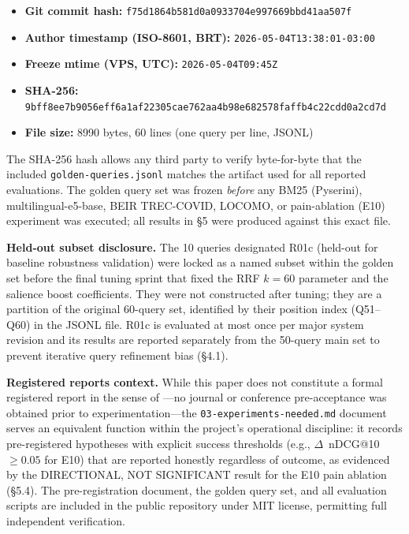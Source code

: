\begin{itemize}
  \item \textbf{Git commit hash:} \texttt{f75d1864b581d0a0933704e997669bbd41aa507f}
  \item \textbf{Author timestamp (ISO-8601, BRT):} \texttt{2026-05-04T13:38:01-03:00}
  \item \textbf{Freeze mtime (VPS, UTC):} \texttt{2026-05-04T09:45Z}
  \item \textbf{SHA-256:} \texttt{9bff8ee7b9056eff6a1af22305cae762aa4b98e682578faffb4c22cdd0a2cd7d}
  \item \textbf{File size:} 8990 bytes, 60 lines (one query per line, JSONL)
\end{itemize}

The SHA-256 hash allows any third party to verify byte-for-byte that the included
\texttt{golden-queries.jsonl} matches the artifact used for all reported evaluations.
The golden query set was frozen \emph{before} any BM25 (Pyserini), multilingual-e5-base,
BEIR TREC-COVID, LOCOMO, or pain-ablation (E10) experiment was executed; all results in
\S5 were produced against this exact file.

\textbf{Held-out subset disclosure.} The 10 queries designated R01c (held-out for baseline
robustness validation) were locked as a named subset within the golden set before the final
tuning sprint that fixed the RRF $k=60$ parameter and the salience boost coefficients.
They were not constructed after tuning; they are a partition of the original 60-query set,
identified by their position index (Q51--Q60) in the JSONL file. R01c is evaluated at most
once per major system revision and its results are reported separately from the 50-query
main set to prevent iterative query refinement bias (\S4.1).

\textbf{Registered reports context.} While this paper does not constitute a formal
registered report in the sense of \cite{munafosystematic2017}---no journal or conference
pre-acceptance was obtained prior to experimentation---the \texttt{03-experiments-needed.md}
document serves an equivalent function within the project's operational discipline: it
records pre-registered hypotheses with explicit success thresholds (e.g.,
$\Delta$~nDCG@10 $\geq 0.05$ for E10) that are reported honestly regardless of outcome,
as evidenced by the DIRECTIONAL, NOT SIGNIFICANT result for the E10 pain ablation (\S5.4).
The pre-registration document, the golden query set, and all evaluation scripts are
included in the public repository under MIT license, permitting full independent
verification.
